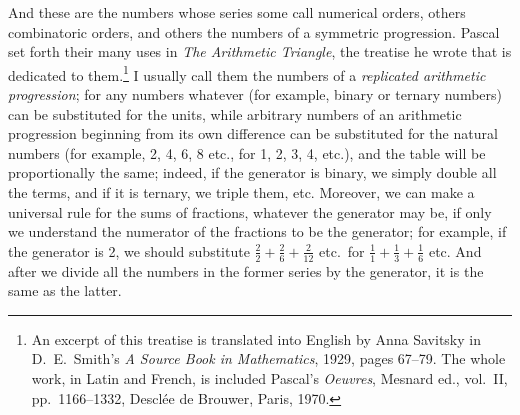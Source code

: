 \documentclass[twoside,openright]{article}
\begin{document}
And these are the numbers whose series some call numerical orders, others
combinatoric orders, and others the numbers of a symmetric progression.
Pascal set forth their many uses in {\em The Arithmetic Triangle},
the treatise he wrote that is dedicated to them.\footnote{An excerpt of this treatise is translated into English by Anna Savitsky in D.\ E.\ Smith's {\em A Source Book in Mathematics}, 1929, pages 67--79.  The whole work, in Latin and French, is included Pascal's {\em Oeuvres}, Mesnard ed., vol.\ II, pp.\ 1166--1332, Descl\'ee de Brouwer, Paris, 1970.} I usually call them the
numbers of a {\em replicated arithmetic progression}; for any numbers whatever
(for example, binary or ternary numbers) can be substituted for the units,
while arbitrary numbers of an arithmetic progression beginning from its own
difference can be substituted for the natural numbers (for example, 2, 4, 6, 8
etc., for 1, 2, 3, 4, etc.), and the table will be proportionally the same;
indeed, if the generator is binary, we simply double all the terms, and if it
is ternary, we triple them, etc.  Moreover, we can make a universal rule for
the sums of fractions, whatever the generator may be, if only we understand
the numerator of the fractions to be the generator; for example, if the
generator is 2, we should substitute $\frac{2}{2} +\frac{2}{6} +\frac{2}{12}$
etc.\ for $\frac{1}{1} +\frac{1}{3} + \frac{1}{6}$ etc.  And after we divide
all the numbers in the former series by the generator, it is the same as the
latter.  
\end{document}
